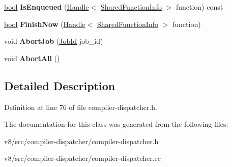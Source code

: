 \begin{DoxyCompactItemize}
\mbox{\hyperlink{classbool}{bool}} {\bfseries Is\+Enqueued} (\mbox{\hyperlink{classv8_1_1internal_1_1Handle}{Handle}}$<$ \mbox{\hyperlink{classv8_1_1internal_1_1SharedFunctionInfo}{Shared\+Function\+Info}} $>$ function) const
\item 
\mbox{\label{classv8_1_1internal_1_1CompilerDispatcher_a6c9c5286f2de9aa0b67890ca5e14502b}} 
\mbox{\hyperlink{classbool}{bool}} {\bfseries Finish\+Now} (\mbox{\hyperlink{classv8_1_1internal_1_1Handle}{Handle}}$<$ \mbox{\hyperlink{classv8_1_1internal_1_1SharedFunctionInfo}{Shared\+Function\+Info}} $>$ function)
\item 
\mbox{\label{classv8_1_1internal_1_1CompilerDispatcher_aa3734b426b0aac7ce9a550b2086e3477}} 
void {\bfseries Abort\+Job} (\mbox{\hyperlink{classuintptr__t}{Job\+Id}} job\+\_\+id)
\item 
\mbox{\label{classv8_1_1internal_1_1CompilerDispatcher_acfc8f178d6c8c9f7f5b251b4854bf279}} 
void {\bfseries Abort\+All} ()
\end{DoxyCompactItemize}


\subsection{Detailed Description}


Definition at line 76 of file compiler-\/dispatcher.\+h.



The documentation for this class was generated from the following files\+:\begin{DoxyCompactItemize}
\item 
v8/src/compiler-\/dispatcher/compiler-\/dispatcher.\+h\item 
v8/src/compiler-\/dispatcher/compiler-\/dispatcher.\+cc\end{DoxyCompactItemize}

